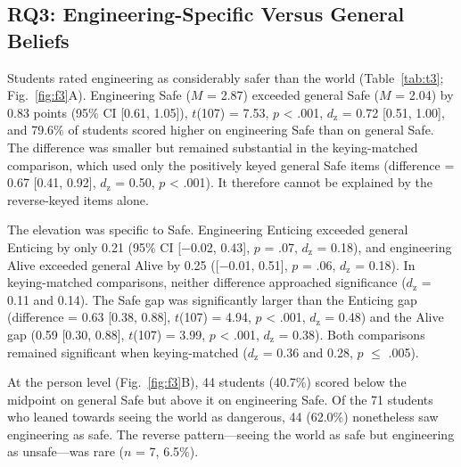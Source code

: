 \documentclass[journal,a4paper]{IEEEtran}
\begin{document}
\subsection{RQ3: Engineering-Specific Versus General Beliefs}

Students rated engineering as considerably safer than the world (Table~\ref{tab:t3}; Fig.~\ref{fig:f3}A). Engineering Safe ($M$ = 2.87) exceeded general Safe ($M$ = 2.04) by 0.83 points (95\% CI [0.61, 1.05]), $t$(107) = 7.53, $p$ < .001, $d_{\mathrm{z}}$ = 0.72 [0.51, 1.00], and 79.6\% of students scored higher on engineering Safe than on general Safe. The difference was smaller but remained substantial in the keying-matched comparison, which used only the positively keyed general Safe items (difference = 0.67 [0.41, 0.92], $d_{\mathrm{z}}$ = 0.50, $p$ < .001). It therefore cannot be explained by the reverse-keyed items alone.

The elevation was specific to Safe. Engineering Enticing exceeded general Enticing by only 0.21 (95\% CI [$-$0.02, 0.43], $p$ = .07, $d_{\mathrm{z}}$ = 0.18), and engineering Alive exceeded general Alive by 0.25 ([$-$0.01, 0.51], $p$ = .06, $d_{\mathrm{z}}$ = 0.18). In keying-matched comparisons, neither difference approached significance ($d_{\mathrm{z}}$ = 0.11 and 0.14). The Safe gap was significantly larger than the Enticing gap (difference = 0.63 [0.38, 0.88], $t$(107) = 4.94, $p$ < .001, $d_{\mathrm{z}}$ = 0.48) and the Alive gap (0.59 [0.30, 0.88], $t$(107) = 3.99, $p$ < .001, $d_{\mathrm{z}}$ = 0.38). Both comparisons remained significant when keying-matched ($d_{\mathrm{z}}$ = 0.36 and 0.28, $p$ $\le$ .005).

At the person level (Fig.~\ref{fig:f3}B), 44 students (40.7\%) scored below the midpoint on general Safe but above it on engineering Safe. Of the 71 students who leaned towards seeing the world as dangerous, 44 (62.0\%) nonetheless saw engineering as safe. The reverse pattern—seeing the world as safe but engineering as unsafe—was rare ($n$ = 7, 6.5\%).
\end{document}

